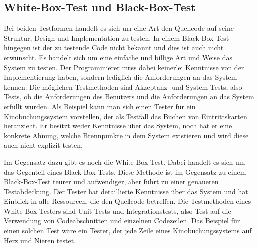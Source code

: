 \subsection{White-Box-Test und Black-Box-Test}
Bei beiden Testformen handelt es sich um eine Art den Quellcode auf seine Struktur, Design und Implementation zu testen.
In einem Black-Box-Test hingegen ist der zu testende Code nicht bekannt und dies ist auch nicht erwünscht.
Es handelt sich um eine einfache und billige Art und Weise das System zu testen.
Der Programmierer muss dabei keinerlei Kenntnisse von der Implementierung haben, sondern lediglich die Anforderungen an das System kennen.
Die möglichen Testmethoden sind Akzeptanz- und System-Tests, also Tests, ob die Anforderungen des Benutzers und die Anforderungen an das System erfüllt wurden.
Als Beispiel kann man sich einen Tester für ein Kinobuchungssystem vorstellen, der als Testfall das Buchen von Eintrittskarten heranzieht.
Er besitzt weder Kenntnisse über das System, noch hat er eine konkrete Ahnung, welche Brennpunkte in dem System existieren und wird diese auch nicht explizit testen.

Im Gegensatz dazu gibt es noch die White-Box-Test.
Dabei handelt es sich um das Gegenteil eines Black-Box-Tests.
Diese Methode ist im Gegensatz zu einem Black-Box-Test teurer und aufwendiger, aber führt zu einer genaueren Testabdeckung.
Der Tester hat detaillierte Kenntnisse über das System und hat Einblick in alle Ressourcen, die den Quellcode betreffen.
Die Testmethoden eines White-Box-Testers sind Unit-Tests und Integrationstests, also Test auf die Verwendung von Codeabschnitten und einzelnen Codezeilen.
Das Beispiel für einen solchen Test wäre ein Tester, der jede Zeile eines Kinobuchungssystems auf Herz und Nieren testet.
